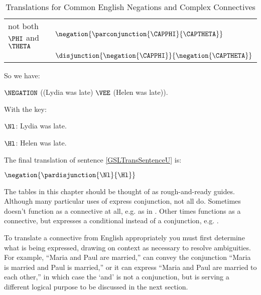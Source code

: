 \begin{majorILnc}{}
\begin{table}
\begin{center}
\begin{tabular}{ l l }
				not both $\PHI$ and $\THETA$ & $\negation{\parconjunction{\CAPPHI}{\CAPTHETA}}$ \\
				& $\disjunction{\negation{\CAPPHI}}{\negation{\CAPTHETA}}$ \\
				\bottomrule
			\end{tabular}
			\caption{Translations for Common English Negations and Complex Connectives}
			\label{TransTableF} 
		\end{center}
	\end{table}  
	So we have: 
	\begin{menumerate}
		\item\label{GSLTransSentenceV} $\NEGATION$ ((Lydia was late) $\VEE$ (Helen was late)).
	\end{menumerate} 
	With the key: 
	\begin{description}[itemsep=0em]
		\item[Translation Scheme:] \hfill{} 
		\begin{description}[itemsep=0em]
			\item $\Nl$: Lydia was late.
			\item $\Hl$: Helen was late. 
		\end{description} 
	\end{description}
	The final translation of sentence \ref{GSLTransSentenceU} is: 
	\begin{menumerate}
		\item\label{GSLTransSentenceW} $\negation{\pardisjunction{\Nl}{\Hl}}$
	\end{menumerate} 
\end{majorILnc}

\noindent{}The tables in this chapter should be thought of as rough-and-ready guides. 
Although many particular uses of  express conjunction, not all do. 
Sometimes  doesn't function as a connective at all, e.g. as in  \citep[107]{Smith2012}.
Other times  functions as a connective, but expresses a conditional instead of a conjunction, e.g.  \citep[107]{Smith2012}.

To translate a connective from English appropriately you must first determine what is being expressed, drawing on context as necessary to resolve ambiguities.
For example, ``Maria and Paul are married,'' can convey the conjunction ``Maria is married and Paul is married,'' or it can express ``Maria and Paul are married to each other,'' in which case the `and' is not a conjunction, but is serving a different logical purpose to be discussed in the next section.

